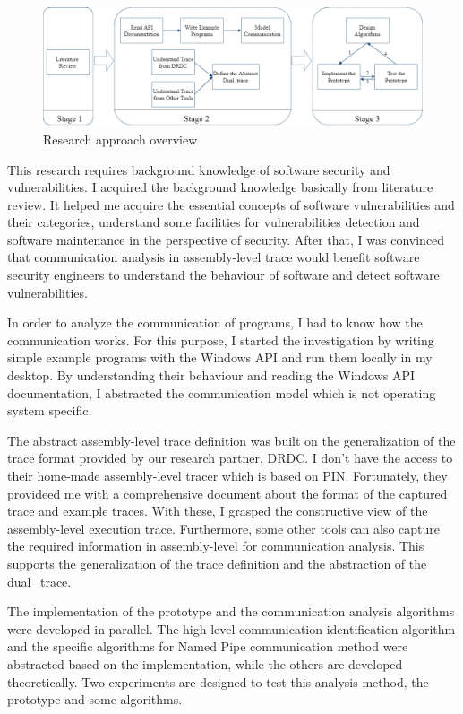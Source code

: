 \begin{figure}[H]
  \centerline{\includegraphics[scale=0.44]{Figures/methodology}}
  \caption{Research approach overview}
  \label{methodology}
  \end{figure}

This research requires background knowledge of software security and vulnerabilities. I acquired the background knowledge basically from literature review. It helped me acquire the essential concepts of software vulnerabilities and their categories, understand some facilities for vulnerabilities detection and software maintenance in the perspective of security. After that, I was convinced that communication analysis in assembly-level trace would benefit software security engineers to understand the behaviour of software and detect software vulnerabilities. 

In order to analyze the communication of programs, I had to know how the communication works. For this purpose, I started the investigation by writing simple example programs with the Windows API and run them locally in my desktop. By understanding their behaviour and reading the Windows API documentation, I abstracted the communication model which is not operating system specific.

The abstract assembly-level trace definition was built on the generalization of the trace format provided by our research partner, DRDC. I don't have the access to their home-made assembly-level tracer which is based on PIN\cite{_pin_????}. Fortunately, they provideed me with a comprehensive document about the format of the captured trace and example traces. With these, I grasped the constructive view of the assembly-level execution trace. Furthermore, some other tools can also capture the required information in assembly-level for communication analysis. This supports the generalization of the trace definition and the abstraction of the dual\_trace.

The implementation of the prototype and the communication analysis algorithms were developed in parallel. The high level communication identification algorithm and the specific algorithms for Named Pipe communication method were abstracted based on the implementation, while the others are developed theoretically. Two experiments are designed to test this analysis method, the prototype and some algorithms. 


